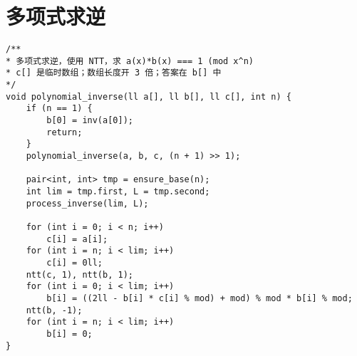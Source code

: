 \section{多项式求逆}

\begin{verbatim}
/** 
* 多项式求逆，使用 NTT，求 a(x)*b(x) === 1 (mod x^n) 
* c[] 是临时数组；数组长度开 3 倍；答案在 b[] 中
*/  
void polynomial_inverse(ll a[], ll b[], ll c[], int n) {  
    if (n == 1) {  
        b[0] = inv(a[0]);  
        return;  
    }  
    polynomial_inverse(a, b, c, (n + 1) >> 1);  

    pair<int, int> tmp = ensure_base(n);
    int lim = tmp.first, L = tmp.second;  
    process_inverse(lim, L);  
        
    for (int i = 0; i < n; i++)  
        c[i] = a[i];  
    for (int i = n; i < lim; i++)  
        c[i] = 0ll;  
    ntt(c, 1), ntt(b, 1);  
    for (int i = 0; i < lim; i++)  
        b[i] = ((2ll - b[i] * c[i] % mod) + mod) % mod * b[i] % mod;  
    ntt(b, -1);  
    for (int i = n; i < lim; i++)  
        b[i] = 0;
}
\end{verbatim}